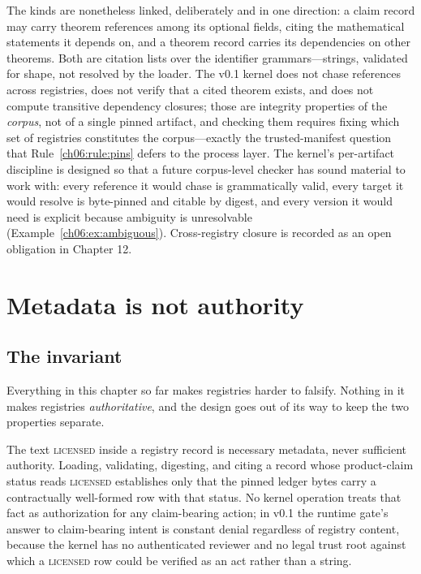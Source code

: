The kinds are nonetheless linked, deliberately and in one direction:
a claim record may carry theorem references among its optional fields,
citing the mathematical statements it depends on, and a theorem record
carries its dependencies on other theorems. Both are citation lists
over the identifier grammars---strings, validated for shape, not
resolved by the loader. The v0.1 kernel does not chase references
across registries, does not verify that a cited theorem exists, and
does not compute transitive dependency closures; those are integrity
properties of the \emph{corpus}, not of a single pinned artifact, and
checking them requires fixing which set of registries constitutes the
corpus---exactly the trusted-manifest question that
Rule~\ref{ch06:rule:pins} defers to the process layer. The kernel's
per-artifact discipline is designed so that a future corpus-level
checker has sound material to work with: every reference it would
chase is grammatically valid, every target it would resolve is
byte-pinned and citable by digest, and every version it would need is
explicit because ambiguity is unresolvable
(Example~\ref{ch06:ex:ambiguous}). Cross-registry closure is recorded
as an open obligation in Chapter 12.

\section{Metadata is not authority}\label{ch06:metadata}

\subsection{The invariant}

Everything in this chapter so far makes registries harder to falsify.
Nothing in it makes registries \emph{authoritative}, and the design goes
out of its way to keep the two properties separate.

\begin{invariant}\label{ch06:inv:metadata}
The text \textsc{licensed} inside a registry record is necessary
metadata, never sufficient authority. Loading, validating, digesting,
and citing a record whose product-claim status reads \textsc{licensed}
establishes only that the pinned ledger bytes carry a contractually
well-formed row with that status. No kernel operation treats that fact
as authorization for any claim-bearing action; in v0.1 the runtime
gate's answer to claim-bearing intent is constant denial regardless of
registry content, because the kernel has no authenticated reviewer and
no legal trust root against which a \textsc{licensed} row could be
verified as an act rather than a string.
\end{invariant}

